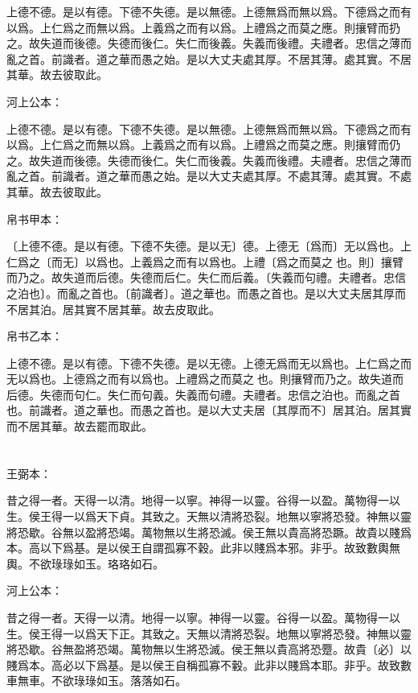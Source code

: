 \documentclass[a5paper]{ctexbook}
\begin{document}
    上德不德。是以有德。下德不失德。是以無德。上德無爲而無以爲。下德爲之而有以爲。上仁爲之而無以爲。上義爲之而有以爲。上禮爲之而莫之應。則攘臂而扔之。故失道而後德。失德而後仁。失仁而後義。失義而後禮。夫禮者。忠信之薄而亂之首。前識者。道之華而愚之始。是以大丈夫處其厚。不居其薄。處其實。不居其華。故去彼取此。

    河上公本：

    上德不德。是以有德。下德不失德。是以無德。上德無爲而無以爲。下德爲之而有以爲。上仁爲之而無以爲。上義爲之而有以爲。上禮爲之而莫之應。則攘臂而仍之。故失道而後德。失德而後仁。失仁而後義。失義而後禮。夫禮者。忠信之薄而亂之首。前識者。道之華而愚之始。是以大丈夫處其厚。不處其薄。處其實。不處其華。故去彼取此。

    帛书甲本：

    〔上德不德。是以有德。下德不失德。是以无〕德。上德无〔爲而〕无以爲也。上仁爲之〔而无〕以爲也。上義爲之而有以爲也。上禮〔爲之而莫之𤻮也。則〕攘臂而乃之。故失道而后德。失德而后仁。失仁而后義。〔失義而句禮。夫禮者。忠信之泊也〕。而亂之首也。〔前識者〕。道之華也。而愚之首也。是以大丈夫居其厚而不居其泊。居其實不居其華。故去皮取此。

    帛书乙本：

    上德不德。是以有德。下德不失德。是以无德。上德无爲而无以爲也。上仁爲之而无以爲也。上德爲之而有以爲也。上禮爲之而莫之𤻮也。則攘臂而乃之。故失道而后德。失德而句仁。失仁而句義。失義而句禮。夫禮者。忠信之泊也。而亂之首也。前識者。道之華也。而愚之首也。是以大丈夫居〔其厚而不〕居其泊。居其實而不居其華。故去罷而取此。

    \chapter{}
    王弼本：

    昔之得一者。天得一以清。地得一以寧。神得一以靈。谷得一以盈。萬物得一以生。侯王得一以爲天下貞。其致之。天無以清將恐裂。地無以寧將恐發。神無以靈將恐歇。谷無以盈將恐竭。萬物無以生將恐滅。侯王無以貴高將恐蹶。故貴以賤爲本。高以下爲基。是以侯王自謂孤寡不穀。此非以賤爲本邪。非乎。故致數輿無輿。不欲琭琭如玉。珞珞如石。

    河上公本：

    昔之得一者。天得一以清。地得一以寧。神得一以靈。谷得一以盈。萬物得一以生。侯王得一以爲天下正。其致之。天無以清將恐裂。地無以寧將恐發。神無以靈將恐歇。谷無盈將恐竭。萬物無以生將恐滅。侯王無以貴高將恐蹷。故貴〔必〕以賤爲本。高必以下爲基。是以侯王自稱孤寡不轂。此非以賤爲本耶。非乎。故致數車無車。不欲琭琭如玉。落落如石。
\end{document}
